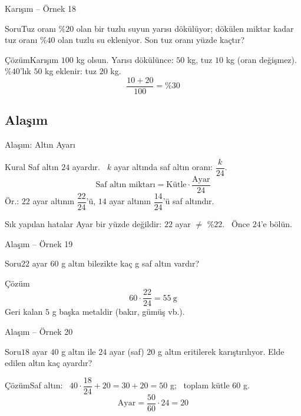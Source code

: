 \documentclass[aspectratio=169,11pt]{beamer}
\newcommand{\soru}[3]{%
\begin{frame}{#1}
  \begin{block}{Soru}\large #2\end{block}
  \pause
  \begin{exampleblock}{Çözüm}\large #3\end{exampleblock}
\end{frame}}
\begin{document}
\soru{Karışım -- Örnek 18}
{Tuz oranı \(\%20\) olan bir tuzlu suyun yarısı dökülüyor; dökülen miktar kadar tuz oranı \(\%40\) olan tuzlu su ekleniyor. Son tuz oranı yüzde kaçtır?}
{Karışım \(100\) kg olsun. Yarısı dökülünce: \(50\) kg, tuz \(10\) kg (oran değişmez).\\[3pt]
\(\%40\)'lık \(50\) kg eklenir: tuz \(20\) kg.
\[\frac{10+20}{100}=\%30\]}

\subsection{Alaşım}
\begin{frame}{Alaşım: Altın Ayarı}
\begin{block}{Kural}
Saf altın \(24\) ayardır. \ \(k\) ayar altında saf altın oranı: \(\dfrac{k}{24}\).
\[\text{Saf altın miktarı}=\text{Kütle}\cdot\frac{\text{Ayar}}{24}\]
Ör.: \(22\) ayar altının \(\dfrac{22}{24}\)'ü, \(14\) ayar altının \(\dfrac{14}{24}\)'ü saf altındır.
\end{block}
\begin{alertblock}{Sık yapılan hatalar}
Ayar bir yüzde değildir: \(22\) ayar \(\neq\) \(\%22\). \ Önce \(24\)'e bölün.
\end{alertblock}
\end{frame}

\soru{Alaşım -- Örnek 19}
{\(22\) ayar \(60\) g altın bilezikte kaç g saf altın vardır?}
{\[60\cdot\frac{22}{24}=55\ \text{g}\]
Geri kalan \(5\) g başka metaldir (bakır, gümüş vb.).}

\soru{Alaşım -- Örnek 20}
{\(18\) ayar \(40\) g altın ile \(24\) ayar (saf) \(20\) g altın eritilerek karıştırılıyor. Elde edilen altın kaç ayardır?}
{Saf altın: \ \(40\cdot\dfrac{18}{24}+20=30+20=50\) g; \ toplam kütle \(60\) g.
\[\text{Ayar}=\frac{50}{60}\cdot 24=20\]}
\end{document}
